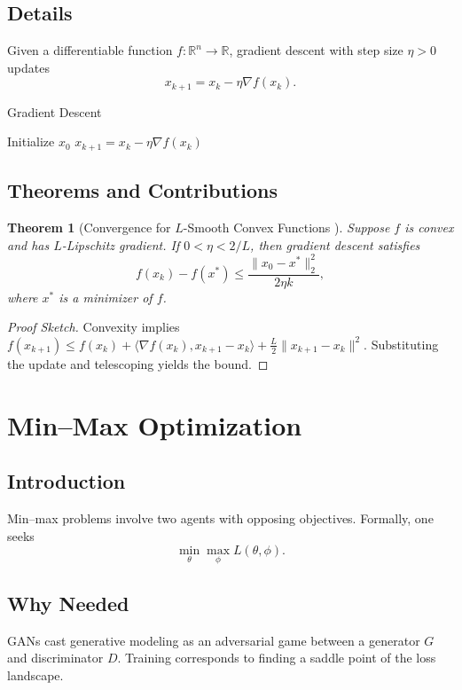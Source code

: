 \documentclass[11pt]{book}
\newtheorem{theorem}{Theorem}[chapter]
\begin{document}
\subsection{Details}
Given a differentiable function $f: \mathbb{R}^n \to \mathbb{R}$, gradient descent with step size $\eta>0$ updates
\begin{equation}
x_{k+1} = x_k - \eta \nabla f(x_k).
\end{equation}

\begin{algorithm}
\caption{Gradient Descent}
\begin{algorithmic}[1]
\STATE Initialize $x_0$
    \STATE $x_{k+1}=x_k-\eta\nabla f(x_k)$
\ENDFOR
\end{algorithmic}
\end{algorithm}

\subsection{Theorems and Contributions}
\begin{theorem}[Convergence for $L$-Smooth Convex Functions \cite{cauchy1847,rockafellar1970}]
Suppose $f$ is convex and has $L$-Lipschitz gradient. If $0<\eta<2/L$, then gradient descent satisfies
\begin{equation}
f(x_k)-f(x^*)\le\frac{\|x_0-x^*\|_2^2}{2\eta k},
\end{equation}
where $x^*$ is a minimizer of $f$.
\end{theorem}
\begin{proof}[Proof Sketch]
Convexity implies $f(x_{k+1})\le f(x_k)+\langle\nabla f(x_k),x_{k+1}-x_k\rangle+\tfrac{L}{2}\|x_{k+1}-x_k\|^2$. Substituting the update and telescoping yields the bound.
\end{proof}

\section{Min--Max Optimization}
\subsection{Introduction}
Min--max problems involve two agents with opposing objectives. Formally, one seeks
\begin{equation}
\min_{\theta} \max_{\phi} L(\theta,\phi).
\end{equation}

\subsection{Why Needed}
GANs cast generative modeling as an adversarial game between a generator $G$ and discriminator $D$. Training corresponds to finding a saddle point of the loss landscape.
\end{document}

